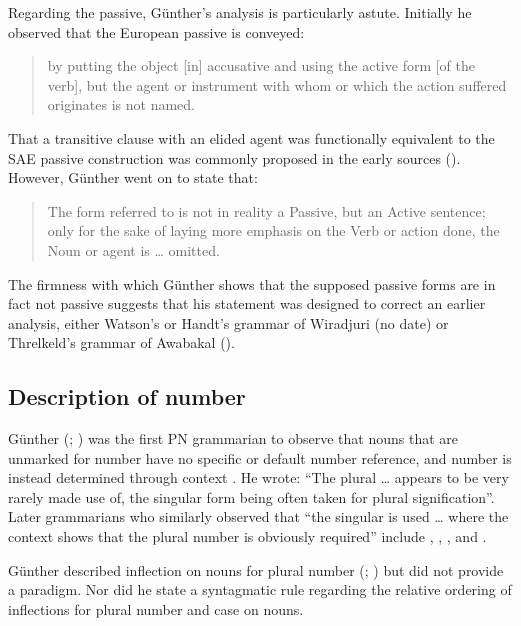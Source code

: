 Regarding the passive, Günther’s analysis is particularly astute. Initially he observed that the European passive is conveyed: 
\begin{quote}
    by putting the object [in] accusative and using the active form [of the verb], but the agent or instrument with whom or which the action suffered originates is not named. \citep[366]{gunther_lecture_1840}
\end{quote}

That a transitive clause with an elided agent was functionally equivalent to the SAE passive construction was commonly proposed in the early sources (). However, Günther went on to state that:

\begin{quote}
    The form referred to is not in reality a Passive, but an Active sentence; only for the sake of laying more emphasis on the Verb or action done, the Noun or agent is … omitted. \citep[366]{gunther_lecture_1840}
\end{quote}

The firmness with which Günther shows that the supposed passive forms are in fact not passive suggests that his statement was designed to correct an earlier analysis, either Watson’s or Handt’s grammar of Wiradjuri (no date) or Threlkeld’s grammar of Awabakal (\citeyear[28]{threlkeld_australian_1834}).

\subsection{Description of number}
\label{sec:key:4.4.1}

Günther (\citeyear[57]{gunther_native_1838}; \citeyear[354]{gunther_lecture_1840}) was the first PN grammarian to observe that nouns that are unmarked for number have no specific or default number reference, and number is instead determined through context \citep[77]{dixon_australian_2002}. He wrote: “The plural … appears to be very rarely made use of, the singular form being often taken for plural signification”. Later grammarians who similarly observed that “the singular is used … where the context shows that the plural number is obviously required” \citep{strehlow_aranda_1944} include \citet[16]{roth_structure_1901}, \citet[6]{livingstone_grammar_1892}, \citet{schoknecht_grammar_1947}, \citet[3]{reuther_dieri_1894} and \citet[11]{hey_elementary_1903}. 

Günther described inflection on nouns for plural number (\citeyear[57]{gunther_native_1838}; \citeyear[354]{gunther_lecture_1840}) but did not provide a paradigm. Nor did he state a syntagmatic rule regarding the relative ordering of inflections for plural number and case on nouns. 

